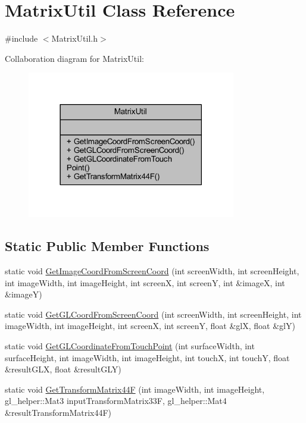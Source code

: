\hypertarget{class_matrix_util}{}\section{Matrix\+Util Class Reference}
\label{class_matrix_util}


{\ttfamily \#include $<$Matrix\+Util.\+h$>$}



Collaboration diagram for Matrix\+Util\+:\nopagebreak
\begin{figure}[H]
\begin{center}
\leavevmode
\includegraphics[width=258pt]{class_matrix_util__coll__graph}
\end{center}
\end{figure}
\subsection*{Static Public Member Functions}
\begin{DoxyCompactItemize}
\item 
static void \hyperlink{class_matrix_util_a8f1decb02c479ea6831e7baa7cf77a38}{Get\+Image\+Coord\+From\+Screen\+Coord} (int screen\+Width, int screen\+Height, int image\+Width, int image\+Height, int screenX, int screenY, int \&imageX, int \&imageY)
\item 
static void \hyperlink{class_matrix_util_a6d00d7dae3bb1c5b685adc3ea191e89e}{Get\+G\+L\+Coord\+From\+Screen\+Coord} (int screen\+Width, int screen\+Height, int image\+Width, int image\+Height, int screenX, int screenY, float \&glX, float \&glY)
\item 
static void \hyperlink{class_matrix_util_a2efb998ca1494b7c6c2887eaa4ca268f}{Get\+G\+L\+Coordinate\+From\+Touch\+Point} (int surface\+Width, int surface\+Height, int image\+Width, int image\+Height, int touchX, int touchY, float \&result\+G\+LX, float \&result\+G\+LY)
\item 
static void \hyperlink{class_matrix_util_a6a1d9aa13dc395bd7a8940ea6784b34e}{Get\+Transform\+Matrix44F} (int image\+Width, int image\+Height, gl\+\_\+helper\+::\+Mat3 input\+Transform\+Matrix33F, gl\+\_\+helper\+::\+Mat4 \&result\+Transform\+Matrix44F)
\end{DoxyCompactItemize}


